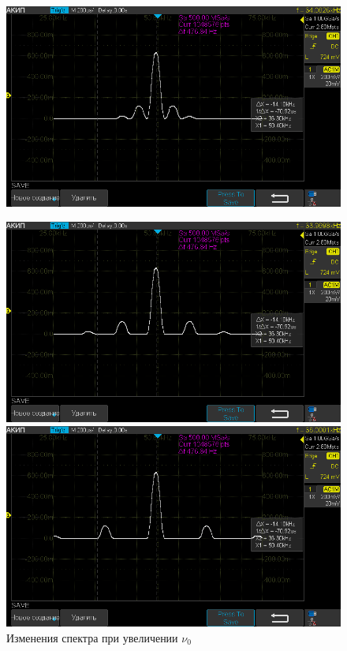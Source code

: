 \documentclass[12pt,a4paper]{article}
\begin{document}
\begin{figure}[H]
	\centering
	\begin{minipage}[b]{.33\textwidth}
		\centering
		\includegraphics[width=0.9\linewidth]{"photo/am1"}
		\label{photo:am}
		\caption{Изменения спектра при увеличении $\nu_{0}$}
	\end{minipage}%
	\begin{minipage}[b]{.33\textwidth}
		\centering
		\includegraphics[width=0.9\linewidth]{"photo/am2"}
	\end{minipage}%
	\begin{minipage}[b]{.33\textwidth}
		\centering
		\includegraphics[width=0.9\linewidth]{"photo/am3"}
	\end{minipage}
\end{figure}
\end{document}
